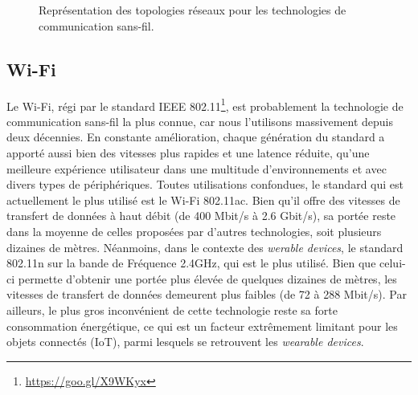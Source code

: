 \begin{figure}[H]
    \centering
    \hspace*{.2\linewidth}
    \\[30pt]
    \hspace*{.1\linewidth}
    \\[30pt]
	\caption{Représentation des topologies réseaux pour les technologies de communication sans-fil.}
\end{figure}

\subsection{Wi-Fi}
Le Wi-Fi, régi par le standard IEEE 802.11\footnote{\url{https://goo.gl/X9WKyx}}, est probablement la technologie de communication sans-fil la plus connue, car nous l'utilisons massivement depuis deux décennies. En constante amélioration, chaque génération du standard a apporté aussi bien des vitesses plus rapides et une latence réduite, qu'une meilleure expérience utilisateur dans une multitude d’environnements et avec divers types de périphériques. Toutes utilisations confondues, le standard qui est actuellement le plus utilisé est le Wi-Fi 802.11ac. Bien qu'il offre des vitesses de transfert de données à haut débit (de 400 Mbit/s à 2.6 Gbit/s), sa portée reste dans la moyenne de celles proposées par d'autres technologies, soit plusieurs dizaines de mètres. Néanmoins, dans le contexte des \textit{werable devices}, le standard 802.11n sur la bande de Fréquence 2.4GHz, qui est le plus utilisé. Bien que celui-ci permette d'obtenir une portée plus élevée de quelques dizaines de mètres, les  vitesses de transfert de données demeurent plus faibles (de 72 à 288 Mbit/s). Par ailleurs, le plus gros inconvénient de cette technologie reste sa forte consommation énergétique, ce qui est un facteur extrêmement limitant pour les objets connectés (\acs{IoT}), parmi lesquels se retrouvent les \textit{wearable devices}.

